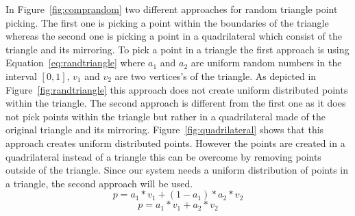 \documentclass[master,english]{hgbthesis}
\begin{document}
In Figure~\ref{fig:comprandom} two different approaches for random triangle point picking. The first one is picking a point within the boundaries of the triangle whereas the second one is picking a  point in a  quadrilateral which consist of the triangle and its mirroring. To pick a point in a triangle the first approach is using Equation~\ref{eq:randtriangle} where $a_1$ and $a_2$ are uniform random numbers in the interval $ \left[0,1 \right] $, $v_1$ and $v_2$ are two vertices's of the triangle. As depicted in Figure~\ref{fig:randtriangle} this approach does not create uniform distributed points within the triangle. The second approach is different from the first one as it does not pick points within the triangle but rather in a quadrilateral made of the original triangle and its mirroring. Figure~\ref{fig:quadrilateral} shows that this approach creates uniform distributed points. However the points are created in a quadrilateral instead of a triangle this can be overcome by removing points outside of the triangle. Since our system needs a uniform distribution of points in a triangle, the second approach will be used.
\begin{equation}
	p=a_1*v_1+(1-a_1)*a_2*v_2
	\label{eq:randtriangle}
\end{equation}
\begin{equation}
	p=a_1*v_1+a_2*v_2
	\label{eq:randquad}
\end{equation}
\end{document}
